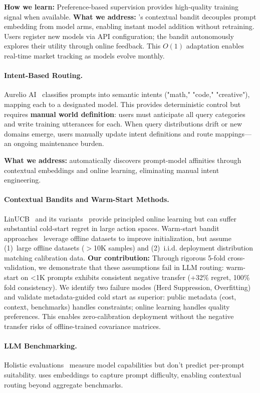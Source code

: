 \textbf{How we learn:} Preference-based supervision provides high-quality training signal when available. \textbf{What we address:} \ours{}'s contextual bandit decouples prompt embedding from model arms, enabling instant model addition without retraining. Users register new models via API configuration; the bandit autonomously explores their utility through online feedback. This $O(1)$ adaptation enables real-time market tracking as models evolve monthly.

\paragraph{Intent-Based Routing.}
Aurelio AI~\cite{aureliolabs2024semantic} classifies prompts into semantic intents ("math," "code," "creative"), mapping each to a designated model. This provides deterministic control but requires \textbf{manual world definition}: users must anticipate all query categories and write training utterances for each. When query distributions drift or new domains emerge, users manually update intent definitions and route mappings---an ongoing maintenance burden.

\textbf{What we address:} \ours{} automatically discovers prompt-model affinities through contextual embeddings and online learning, eliminating manual intent engineering.

\paragraph{Contextual Bandits and Warm-Start Methods.}
LinUCB~\cite{li2010contextual} and its variants~\cite{abbasi2011improved} provide principled online learning but can suffer substantial cold-start regret in large action spaces. Warm-start bandit approaches~\cite{bietti2021contextual} leverage offline datasets to improve initialization, but assume (1)~large offline datasets ($>$10K samples) and (2)~i.i.d. deployment distribution matching calibration data. \textbf{Our contribution:} Through rigorous 5-fold cross-validation, we demonstrate that these assumptions fail in LLM routing: warm-start on <1K prompts exhibits consistent negative transfer (+32\% regret, 100\% fold consistency). We identify two failure modes (Herd Suppression, Overfitting) and validate metadata-guided cold start as superior: public metadata (cost, context, benchmarks) handles constraints; online learning handles quality preferences. This enables zero-calibration deployment without the negative transfer risks of offline-trained covariance matrices.

\paragraph{LLM Benchmarking.}
Holistic evaluations~\cite{liang2022holistic,srivastava2022beyond} measure model capabilities but don't predict per-prompt suitability. \ours{} uses embeddings to capture prompt difficulty, enabling contextual routing beyond aggregate benchmarks.


